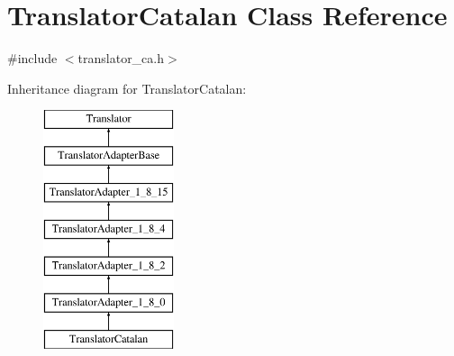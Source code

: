 \hypertarget{class_translator_catalan}{}\section{Translator\+Catalan Class Reference}
\label{class_translator_catalan}


{\ttfamily \#include $<$translator\+\_\+ca.\+h$>$}

Inheritance diagram for Translator\+Catalan\+:\begin{figure}[H]
\begin{center}
\leavevmode
\includegraphics[height=7.000000cm]{class_translator_catalan}
\end{center}
\end{figure}
